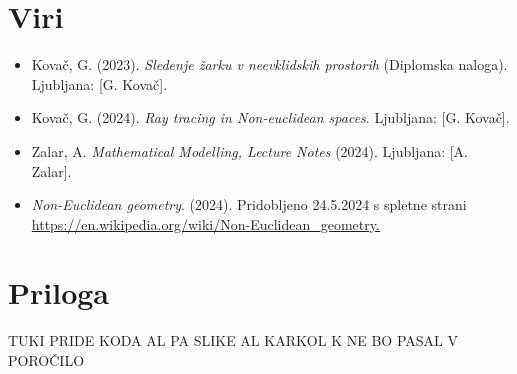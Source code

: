 \documentclass[titlepage]{article}
\begin{document}
\section{Viri}
\begin{itemize}
  \item Kovač, G. (2023). \textit{Sledenje žarku v neevklidskih
prostorih} (Diplomska naloga). Ljubljana: [G. Kovač].
  \item Kovač, G. (2024). \textit{Ray tracing in Non-euclidean spaces}. Ljubljana: [G. Kovač].
  \item Zalar, A. \textit{Mathematical Modelling, Lecture Notes} (2024). Ljubljana: [A. Zalar].
    \item \textit{Non-Euclidean geometry}. (2024). Pridobljeno 24.5.2024 s spletne strani \url{https://en.wikipedia.org/wiki/Non-Euclidean_geometry.}
\end{itemize}

\section{Priloga}
TUKI PRIDE KODA AL PA SLIKE AL KARKOL K NE BO PASAL V POROČILO
\end{document}
